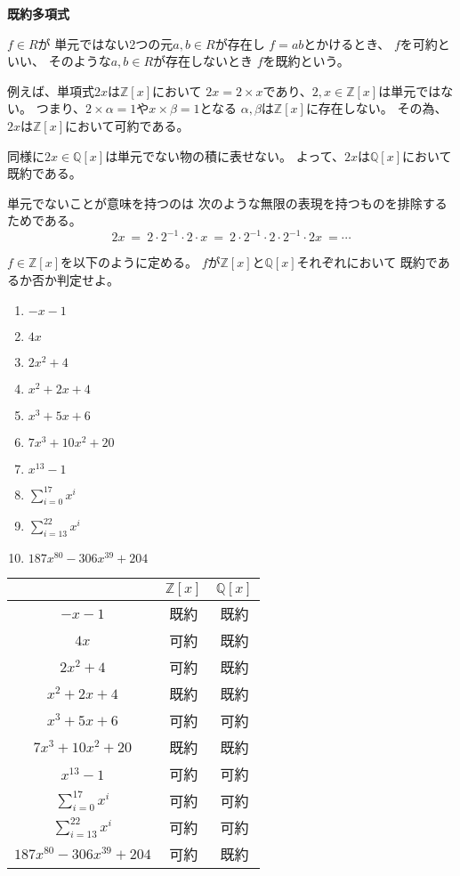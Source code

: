 \documentclass[12pt,b5paper]{ltjsarticle}
\begin{document}
\textbf{既約多項式}

\dotfill

$f\in R$が
単元ではない2つの元$a,b\in R$が存在し
$f=ab$とかけるとき、
$f$を可約といい、
そのような$a,b\in R$が存在しないとき
$f$を既約という。


例えば、単項式$2x$は$\mathbb{Z}[x]$において
$2x=2\times x$であり、$2,x\in\mathbb{Z}[x]$は単元ではない。
つまり、$2\times \alpha =1$や$x\times \beta =1$となる
$\alpha,\beta$は$\mathbb{Z}[x]$に存在しない。
その為、$2x$は$\mathbb{Z}[x]$において可約である。

同様に$2x\in\mathbb{Q}[x]$は単元でない物の積に表せない。
よって、$2x$は$\mathbb{Q}[x]$において既約である。

単元でないことが意味を持つのは
次のような無限の表現を持つものを排除するためである。
\begin{equation}
 2x \ = \ 2\cdot 2^{-1}\cdot 2 \cdot x\
  =\ 2\cdot 2^{-1}\cdot 2 \cdot 2^{-1}\cdot 2  x\
  = \cdots
\end{equation}


\hrulefill

\hrulefill

$f\in\mathbb{Z}[x]$を以下のように定める。
$f$が$\mathbb{Z}[x]$と$\mathbb{Q}[x]$それぞれにおいて
既約であるか否か判定せよ。

\begin{minipage}{200pt}
 \begin{enumerate}
  \item $-x-1$
  \item $4x$
  \item $2x^2+4$
  \item $x^2+2x+4$
  \item $x^3+5x+6$
  \item $7x^3+10x^2+20$
  \item $x^{13}-1$
  \item $\sum_{i=0}^{17}x^i$
  \item $\sum_{i=13}^{22}x^i$
  \item $187x^{80}-306x^{39}+204$
 \end{enumerate}
\end{minipage}
\begin{minipage}{100pt}
 \begin{tabular}{|c|c|c|}
  & $\mathbb{Z}[x]$ & $\mathbb{Q}[x]$ \\
  \hline
  $-x-1$ & 既約 & 既約 \\
  $4x$ & 可約 & 既約 \\
  $2x^2+4$ & 可約 & 既約 \\
  $x^2+2x+4$ & 既約 & 既約 \\
  $x^3+5x+6$ & 可約 & 可約 \\
  $7x^3+10x^2+20$ & 既約 & 既約 \\
  $x^{13}-1$ & 可約 & 可約 \\
  $\sum_{i=0}^{17}x^i$ & 可約 & 可約 \\
  $\sum_{i=13}^{22}x^i$ & 可約 & 可約 \\
  $187x^{80}-306x^{39}+204$ & 可約 & 既約
 \end{tabular}
\end{minipage}
\end{document}
